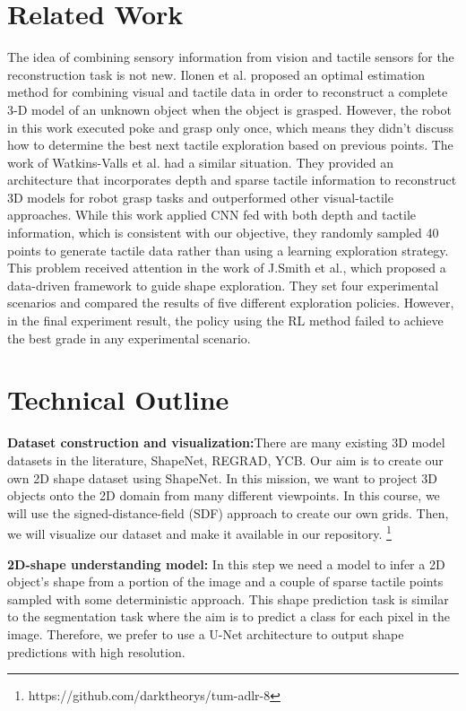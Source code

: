 \documentclass[conference]{IEEEtran}
\begin{document}
\section{Related Work}
The idea of combining sensory information from vision and tactile sensors for the reconstruction task is not new. Ilonen et al.\cite{6631074} proposed an optimal estimation method for combining visual and tactile data in order to reconstruct a complete 3-D model of  an unknown object when the object is grasped.  However, the robot in this work executed poke and grasp only once, which means they didn’t discuss how to determine the best next tactile exploration based on previous points. The work of Watkins-Valls et al. had a similar situation.\cite{https://doi.org/10.48550/arxiv.1803.07671}  They provided an architecture that incorporates depth and sparse tactile information to reconstruct 3D models for robot grasp tasks and outperformed other visual-tactile approaches. While this work applied CNN fed with both depth and tactile information, which is consistent with our objective, they randomly sampled 40 points to generate tactile data rather than using a learning exploration strategy. This problem received attention in the work of J.Smith et al.\cite{https://doi.org/10.48550/arxiv.2107.09584}, which proposed a data-driven framework to guide shape exploration. They set four experimental scenarios and compared the results of five different exploration policies. However, in the final experiment result, the policy using the RL method failed to achieve the best grade in any experimental scenario. 

\section{Technical Outline}
\textbf{Dataset construction and visualization:}There are many existing 3D model datasets in the literature, ShapeNet\cite{https://doi.org/10.48550/arxiv.1512.03012}, REGRAD\cite{https://doi.org/10.48550/arxiv.2104.14118}, YCB\cite{Calli_2015}. Our aim is to create our own 2D shape dataset using ShapeNet. In this mission, we want to project 3D objects onto the 2D domain from many different viewpoints. In this course, we will use the signed-distance-field (SDF) approach to create our own grids. Then, we will visualize our dataset and make it available in our repository. \footnote{https://github.com/darktheorys/tum-adlr-8} 

\textbf{2D-shape understanding model:} In this step we need a model to infer a 2D object's shape from a portion of the image and a couple of sparse tactile points sampled with some deterministic approach. This shape prediction task is similar to the segmentation task where the aim is to predict a class for each pixel in the image. Therefore, we prefer to use a U-Net\cite{https://doi.org/10.48550/arxiv.1505.04597} architecture to output shape predictions with high resolution.
\end{document}
